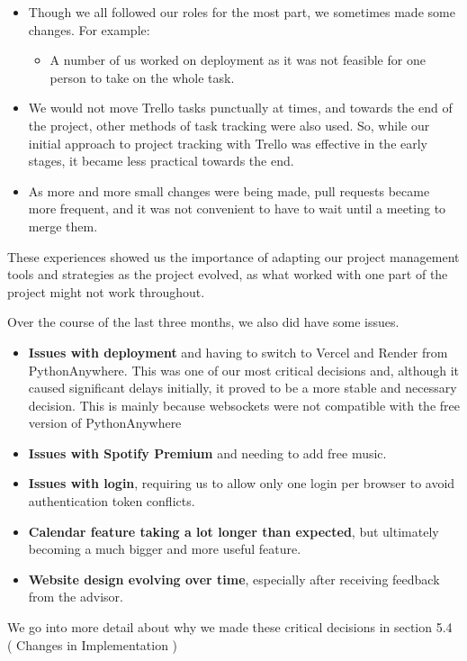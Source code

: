 \begin{itemize}
    \item Though we all followed our roles for the most part, we sometimes made some changes. For example:
    \begin{itemize}
        \item A number of us worked on deployment as it was not feasible for one person to take on the whole task.
    \end{itemize}
    \item We would not move Trello tasks punctually at times, and towards the end of the project, other methods of task tracking were also used.
    So, while our initial approach to project tracking with Trello was effective in the early stages, it became less practical towards the end.
    \item As more and more small changes were being made, pull requests became more frequent, and it was not convenient to have to wait until a meeting to merge them.
\end{itemize}

These experiences showed us the importance of adapting our project management tools and strategies as the project evolved, as what worked with one part of the project might not work throughout.

Over the course of the last three months, we also did have some issues.

\begin{itemize}
    \item \textbf{Issues with deployment} and having to switch to Vercel and Render from PythonAnywhere. This was one of our most critical decisions and, although it caused significant delays initially, it proved to be a more stable and necessary decision. This is mainly because websockets were not compatible with the free version of PythonAnywhere
    \item \textbf{Issues with Spotify Premium} and needing to add free music.
    \item \textbf{Issues with login}, requiring us to allow only one login per browser to avoid authentication token conflicts.
    \item \textbf{Calendar feature taking a lot longer than expected}, but ultimately becoming a much bigger and more useful feature.
    \item \textbf{Website design evolving over time}, especially after receiving feedback from the advisor.
\end{itemize}

We go into more detail about why we made these critical decisions in section 5.4 ( Changes in Implementation )
